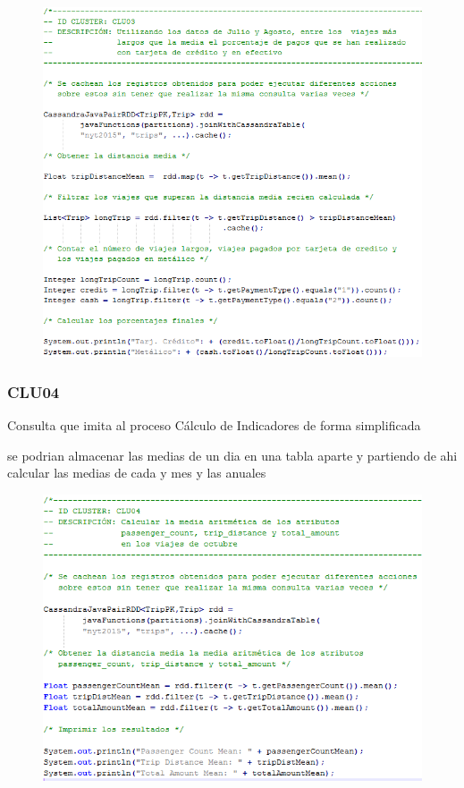 \begin{figure}[h]
	\centering
	\includegraphics[width=1\textwidth]{Ilustraciones/CLU03.png}
\end{figure}

\clearpage

\subsubsection[]{CLU04}

Consulta que imita al proceso Cálculo de Indicadores de forma simplificada

se podrian almacenar las medias de un dia en una tabla aparte y partiendo de ahi calcular las medias de cada y mes y las anuales

\begin{figure}[h]
	\centering
	\includegraphics[width=1\textwidth]{Ilustraciones/CLU04.png}
\end{figure}

